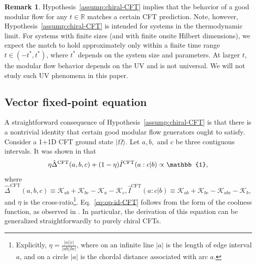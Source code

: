\documentclass[12pt, nofootinbib]{article}
\theoremstyle{plain}
\theoremstyle{assumption}
\theoremstyle{definition}
\newtheorem*{remark}{Remark}
\theoremstyle{plain}
\theoremstyle{plain}
\theoremstyle{plain}
\theoremstyle{plain}
\theoremstyle{plain}
\def\Kcft{\mathscr{K}}
\def\CFT{\mathrm{CFT}}
\begin{document}
\begin{remark}
    Hypothesis~\ref{assump:chiral-CFT} implies that the behavior of a good modular flow for any $t \in \mathbb{R}$ matches a certain CFT prediction. Note, however, Hypothesis~\ref{assump:chiral-CFT} is intended for systems in the thermodynamic limit.
    For systems with finite sizes (and with finite onsite Hilbert dimensions), we expect the match to hold approximately only within a finite time range $t \in (-t^\ast, t^\ast)$, where $t^\ast$ depends on the system size and parameters. At larger $t$, the modular flow behavior depends on the UV and is not universal. 
    We will not study such UV phenomena in this paper. 
\end{remark}

\subsection{Vector fixed-point equation}
\label{sec:locally_checkable}
 

A straightforward consequence of Hypothesis~\ref{assump:chiral-CFT} is that there is a nontrivial identity that certain good modular flow generators ought to satisfy. Consider a 1+1D CFT ground state $|\Omega\rangle$. Let $a, b, $ and $c$ be three contiguous intervals. It was shown in \cite{Lin2023} that
\begin{equation}\label{eq:op-id-CFT}
    \eta \hat{\Delta}^{\rm CFT}(a,b,c) + (1-\eta)\hat{I}^{\rm CFT}(a:c|b)  \propto \mathbb{1},
\end{equation}
where $\hat{\Delta}^{\mathrm{CFT}}(a,b,c) \equiv \Kcft_{ab}+\Kcft_{bc}- \Kcft_{a}- \Kcft_c, \hat{I}^{\CFT}(a:c|b)\equiv \Kcft_{ab}+ \Kcft_{bc}- \Kcft_{abc}- \Kcft_b$, 
and $\eta$ is the cross-ratio\footnote{Explicitly, $\eta = \frac{|a| |c|}{|ab| |bc|}$, where on an infinite line $|a|$ is the length of edge interval $a$, and on a circle $|a|$ is the chordal distance associated with arc $a$.}.
Eq.~\eqref{eq:op-id-CFT} follows from the form of the coolness function, as observed in \cite{Lin2023}. In particular, the derivation of this equation can be generalized straightforwardly to purely chiral CFTs.

 
\end{document}
